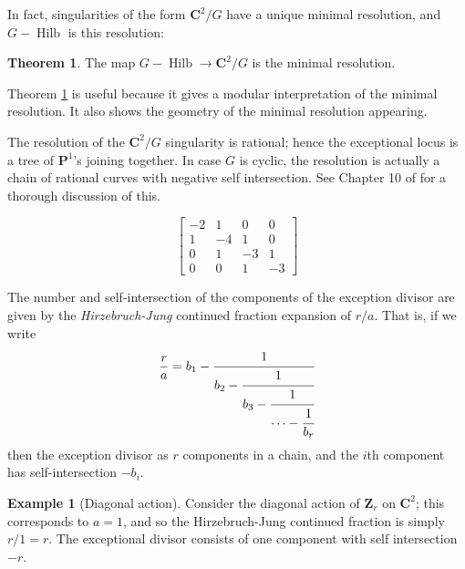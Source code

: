 \documentclass{amsart}[12pt]
\theoremstyle{definition}
\newtheorem{theorem}[dummy]{Theorem}
\newtheorem{example}[dummy]{Example}
\newcommand{\Z}{\mathbf{Z}}
\newcommand{\C}{\mathbf{C}}
\newcommand{\proj}{\mathbf{P}}
\DeclareMathOperator{\Hilb}{Hilb}
\begin{document}
In fact, singularities of the form $\C^2/G$ have a unique minimal resolution, and $G-\Hilb$ is this resolution:





\begin{theorem} \label{thm:GHilb-resolution}
The map $G-\Hilb\to \C^2/G$ is the minimal resolution.
\end{theorem}

Theorem \ref{thm:GHilb-resolution} is useful because it gives a modular interpretation of the minimal resolution.  It also shows the geometry of the minimal resolution appearing.

The resolution of the $\C^2/G$ singularity is rational; hence the exceptional locus is a tree of $\proj^1$'s joining together.  In case $G$ is cyclic, the resolution is actually a chain of rational curves with negative self intersection.  See Chapter 10 of \cite{toric} for a thorough discussion of this.

\begin{center}
\end{center}

$$
\begin{bmatrix}
-2 & 1 & 0 & 0 \\
1 & -4 & 1 & 0 \\
0 & 1 & -3 & 1 \\
0 & 0 & 1 & -3 
\end{bmatrix}
$$

The number and self-intersection of the components of the exception divisor are given by the \emph{Hirzebruch-Jung} continued fraction expansion of $r/a$.  That is, if we write
$$
\frac{r}{a}=b_1-\cfrac{1}{b_2-\cfrac{1}{b_3-\cfrac{1}{\cdots - \cfrac{1}{b_r}}}}
$$  
then the exception divisor as $r$ components in a chain, and the $i$th component has self-intersection $-b_i$. 

\begin{example}[Diagonal action]
Consider the diagonal action of $\Z_r$ on $\C^2$; this corresponds to $a=1$, and so the Hirzebruch-Jung continued fraction is simply $r/1=r$.  The exceptional divisor consists of one component with self intersection $-r$.

\end{example}
\end{document}
